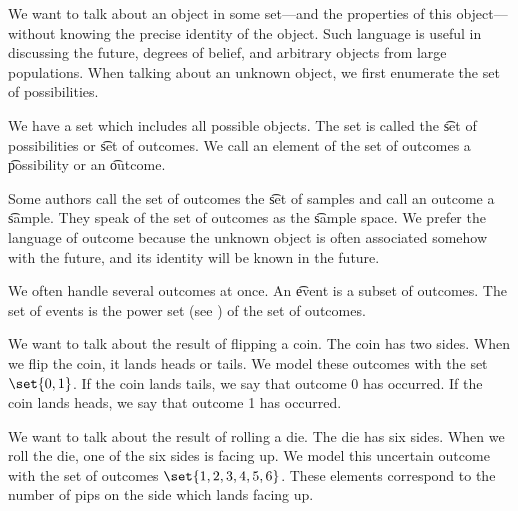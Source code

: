 

We want to talk about an object in some set---and the properties of this object---without knowing the precise identity of the object.
Such language is useful in discussing the future, degrees of belief, and arbitrary objects from large populations.
When talking about an unknown object, we first enumerate the set of possibilities.


We have a set which includes all possible objects.
The set is called the \t{set of possibilities} or \t{set of outcomes}.
We call an element of the set of outcomes a \t{possibility} or an \t{outcome}.

Some authors call the set of outcomes the \t{set of samples} and call an outcome a \t{sample}.
They speak of the set of outcomes as the \t{sample space}.
We prefer the language of outcome because the unknown object is often associated somehow with the future, and its identity will be known in the future.

We often handle several outcomes at once.
An \t{event} is a subset of outcomes.
The set of events is the power set (see ) of the set of outcomes.


We want to talk about the result of flipping a coin.
The coin has two sides.
When we flip the coin, it lands heads or tails.
We model these outcomes with the set $\set{0, 1}$.
If the coin lands tails, we say that outcome 0 has occurred.
If the coin lands heads, we say that outcome 1 has occurred.


We want to talk about the result of rolling a die.
The die has six sides.
When we roll the die, one of the six sides is facing up.
We model this uncertain outcome with the set of outcomes $\set{1, 2, 3, 4, 5, 6}$.
These elements correspond to the number of pips on the side which lands facing up.
